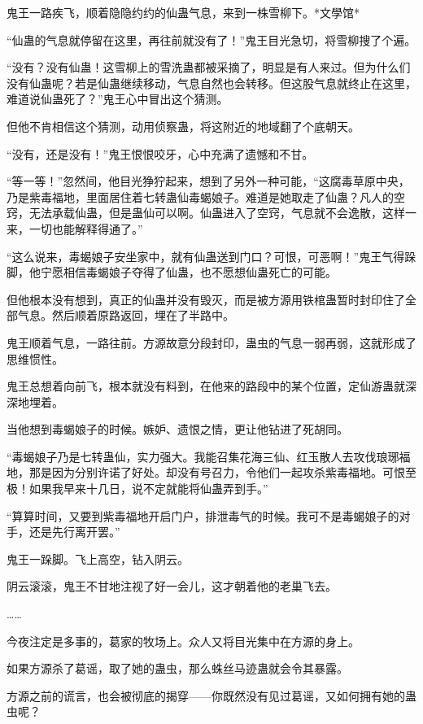 
\begin{this_body}

鬼王一路疾飞，顺着隐隐约约的仙蛊气息，来到一株雪柳下。*文學馆*

“仙蛊的气息就停留在这里，再往前就没有了！”鬼王目光急切，将雪柳搜了个遍。

“没有？没有仙蛊！这雪柳上的雪洗蛊都被采摘了，明显是有人来过。但为什么们没有仙蛊呢？若是仙蛊继续移动，气息自然也会转移。但这股气息就终止在这里，难道说仙蛊死了？”鬼王心中冒出这个猜测。

但他不肯相信这个猜测，动用侦察蛊，将这附近的地域翻了个底朝天。

“没有，还是没有！”鬼王恨恨咬牙，心中充满了遗憾和不甘。

“等一等！”忽然间，他目光狰狞起来，想到了另外一种可能，“这腐毒草原中央，乃是紫毒福地，里面居住着七转蛊仙毒蝎娘子。难道是她取走了仙蛊？凡人的空窍，无法承载仙蛊，但是蛊仙可以啊。仙蛊进入了空窍，气息就不会逸散，这样一来，一切也能解释得通了。”

“这么说来，毒蝎娘子安坐家中，就有仙蛊送到门口？可恨，可恶啊！”鬼王气得跺脚，他宁愿相信毒蝎娘子夺得了仙蛊，也不愿想仙蛊死亡的可能。

但他根本没有想到，真正的仙蛊并没有毁灭，而是被方源用铁棺蛊暂时封印住了全部气息。然后顺着原路返回，埋在了半路中。

鬼王顺着气息，一路往前。方源故意分段封印，蛊虫的气息一弱再弱，这就形成了思维惯性。

鬼王总想着向前飞，根本就没有料到，在他来的路段中的某个位置，定仙游蛊就深深地埋着。

当他想到毒蝎娘子的时候。嫉妒、遗恨之情，更让他钻进了死胡同。

“毒蝎娘子乃是七转蛊仙，实力强大。我能召集花海三仙、红玉散人去攻伐琅琊福地，那是因为分别许诺了好处。却没有号召力，令他们一起攻杀紫毒福地。可恨至极！如果我早来十几日，说不定就能将仙蛊弄到手。”

“算算时间，又要到紫毒福地开启门户，排泄毒气的时候。我可不是毒蝎娘子的对手，还是先行离开罢。”

鬼王一跺脚。飞上高空，钻入阴云。

阴云滚滚，鬼王不甘地注视了好一会儿，这才朝着他的老巢飞去。

……

今夜注定是多事的，葛家的牧场上。众人又将目光集中在方源的身上。

如果方源杀了葛谣，取了她的蛊虫，那么蛛丝马迹蛊就会令其暴露。

方源之前的谎言，也会被彻底的揭穿——你既然没有见过葛谣，又如何拥有她的蛊虫呢？


\end{this_body}

